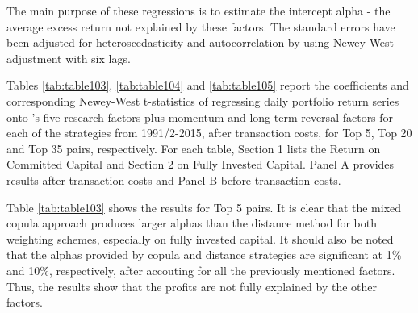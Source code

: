 \documentclass[a4paper]{article}
\begin{document}
	

	The main purpose of these regressions is to estimate the intercept alpha - the average excess return not explained by these factors. The standard errors have been adjusted for heteroscedasticity and autocorrelation by using Newey-West adjustment with six lags.
	
	Tables \ref{tab:table103}, \ref{tab:table104} and \ref{tab:table105} report the coefficients and corresponding Newey-West t-statistics of regressing daily portfolio return series onto \citet*{ff15}'s five research factors plus momentum and long-term reversal factors for each of the strategies from 1991/2-2015, after transaction costs, for Top 5, Top 20 and Top 35 pairs, respectively. For each table, Section 1 lists the Return on Committed Capital and Section 2 on Fully Invested Capital. Panel A provides results after transaction costs and Panel B before transaction costs.
	
	Table \ref{tab:table103} shows the results for Top 5 pairs. It is clear that the mixed copula approach produces larger alphas than the distance method for both weighting schemes, especially on fully invested capital. It should also be noted that the alphas provided by copula and distance strategies are significant at 1\% and 10\%, respectively, after accouting for all the previously mentioned factors. Thus, the results show that the profits are not fully explained by the other factors.
	
\end{document}
